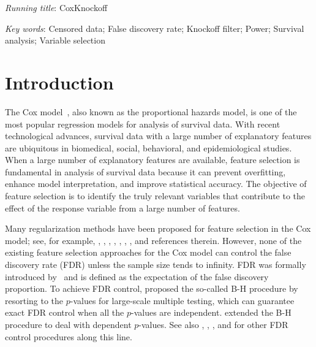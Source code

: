 \documentclass[11pt]{article}
\begin{document}
\textit{Running title}: CoxKnockoff

\textit{Key words}: Censored data; False discovery rate; Knockoff filter; Power; Survival analysis; Variable selection


\newpage
\section{Introduction}\label{sec:Intro}


The Cox model~\citep{cox1972regression}, also known as the proportional hazards model, is one of the most popular regression models for analysis of survival data. With recent technological advances, survival data with a large number of explanatory features are ubiquitous in biomedical, social, behavioral, and epidemiological studies. When a large number of explanatory features are available, feature selection is fundamental in analysis of survival data because it can prevent overfitting, enhance model interpretation, and improve statistical accuracy. The objective of feature selection is to identify the truly relevant variables that contribute to the effect of the response variable from a large number of features. 


Many regularization methods have been proposed for feature selection in the Cox model; see, for example, \cite{tibshirani1997lasso}, \cite{fan2002variable}, 
\cite{zhang2007adaptive}, \cite{zou2008note}, \cite{antoniadis2010dantzig},
\cite{bradic2011regularization},
\cite{huang2013oracle},
and references therein. However, none of the existing feature selection approaches for the Cox model can control the false discovery rate (FDR) unless the sample size tends to infinity. FDR was formally introduced by~\cite{benjamini1995controlling} and is defined as the expectation of the false discovery proportion.
To achieve FDR control, \cite{benjamini1995controlling} proposed the so-called B-H procedure by resorting to the $p$-values for large-scale multiple testing, which  
can guarantee exact FDR control when all the $p$-values are independent. \cite{benjamini2001control} extended the B-H procedure to deal with dependent $p$-values. See also \cite{storey2002direct}, \cite{abramovich2006adapting},  \cite{fan2012estimating}, and \cite{sarkar2022adjusting} for other FDR control procedures along this line.  
\end{document}
